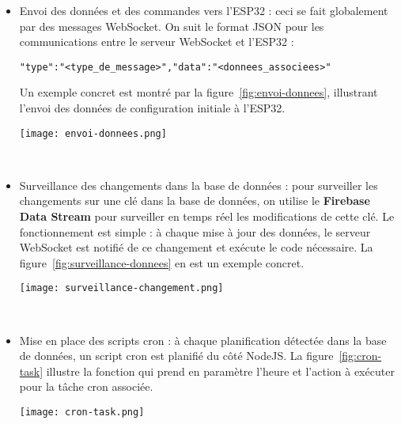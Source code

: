 \begin{itemize}
\item Envoi des données et des commandes vers l'ESP32 : ceci se fait globalement par des messages WebSocket. On suit le format JSON pour les communications entre le serveur WebSocket et l'ESP32 :\begin{alltt}
{ "type": "<type_de_message>", "data": "<donnees_associees>" }
\end{alltt} 
Un exemple concret est montré par la figure~\ref{fig:envoi-donnees}, illustrant l'envoi des données de configuration initiale à l'ESP32.

\begin{minipage}{\linewidth}
  \centering
  \texttt{[image: envoi-donnees.png]}
  \label{fig:envoi-donnees}
\end{minipage}
\\

\item Surveillance des changements dans la base de données : pour surveiller les changements sur une clé dans la base de données, on utilise le \textbf{Firebase Data Stream} pour surveiller en temps réel les modifications de cette clé. Le fonctionnement est simple : à chaque mise à jour des données, le serveur WebSocket est notifié de ce changement et exécute le code nécessaire. La figure~\ref{fig:surveillance-donnees} en est un exemple concret.

\begin{minipage}{\linewidth}
  \centering
  \texttt{[image: surveillance-changement.png]}
  \label{fig:surveillance-donnees}
\end{minipage}
\\

\item Mise en place des scripts cron : à chaque planification détectée dans la base de données, un script cron est planifié du côté NodeJS. La figure~\ref{fig:cron-task} illustre la fonction qui prend en paramètre l'heure et l'action à exécuter pour la tâche cron associée.

\begin{minipage}{\linewidth}
  \centering
  \texttt{[image: cron-task.png]}
  \label{fig:cron-task}
\end{minipage}
\\
\end{itemize}


